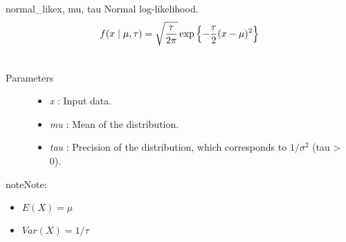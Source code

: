 \hypertarget{pymc.distributions.normal_like}{}\begin{funcdesc}{normal\_like}{x, mu, tau}
Normal log-likelihood.
\begin{gather}
\begin{split}f(x \mid \mu, \tau) = \sqrt{\frac{\tau}{2\pi}} \exp\left\{ -\frac{\tau}{2} (x-\mu)^2 \right\}\end{split}\notag\\\begin{split}\end{split}\notag
\end{gather}\begin{description}
\item[Parameters] \leavevmode\begin{itemize}
\item {}
\emph{x} : Input data.

\item {}
\emph{mu} : Mean of the distribution.

\item {}
\emph{tau} : Precision of the distribution, which corresponds to $1/\sigma^2$ (tau \textgreater{} 0).

\end{itemize}

\end{description}

\begin{notice}{note}{Note:}\begin{itemize}
\item {}
$E(X) = \mu$

\item {}
$Var(X) = 1/\tau$

\end{itemize}
\end{notice}
\end{funcdesc}

